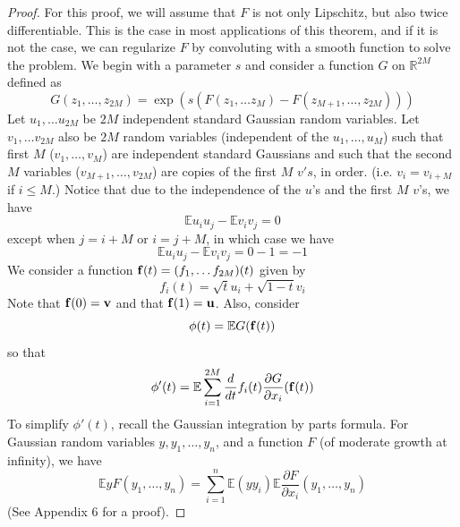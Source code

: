 \documentclass[12pt]{report}
\theoremstyle{definition}
\begin{document}
\begin{proof}
For this proof, we will assume that $F$ is not only Lipschitz, but also twice differentiable.  This is the case in most applications of this theorem, and if it is not the case, we can regularize $F$ by convoluting with a smooth function to solve the problem.  We begin with a parameter $s$ and consider a function $G$ on $\mathbb{R}^{2M}$ defined as 
$$
G(z_1,\dots,z_{2M})=\exp\left ( s(F(z_1,\dots z_M)-F(z_{M+1},\dots, z_{2M}))\right)
$$
Let $u_1,\dots u_{2M}$ be $2M$ independent standard Gaussian random variables.  Let $v_1,\dots v_{2M}$ also be $2M$ random variables (independent of the $u_1,\dots, u_M$) such that first $M$ ($v_1,\dots, v_M$) are independent standard Gaussians and such that the second $M$ variables ($v_{M+1}, \dots, v_{2M}$) are copies of the first $M$ $v's$, in order.  (i.e. $v_i=v_{i+M}$ if $i\leq M$.)
Notice that due to the independence of the $u$'s and the first $M$ $v$'s, we have 
$$
\mathbb{E}u_iu_j-\mathbb{E}v_iv_j =0
$$
except when $j=i+M $ or $i=j+M$, in which case we have 
$$
\mathbb{E}u_iu_j-\mathbb{E}v_iv_j=0-1=-1
$$
We consider a function ${\bf f}(t)=(f_1,\dots f_{2M})(t)$ given by 
$$
f_i(t)=\sqrt{t}u_i+\sqrt{1-t}v_i
$$
Note that ${\bf f}(0)={\bf v}$ and that ${\bf f}(1)={\bf u}$.  
Also, consider 
$$
\phi(t)=\mathbb{E}G({\bf f}(t))
$$
so that 
$$ \phi '(t)=\mathbb{E}\sum_{i=1}^{2M}\frac{d}{dt}f_i(t)\frac{\partial G}{\partial x_i}({\bf f}(t))
$$
To simplify $\phi '(t)$, recall the Gaussian integration by parts formula.  For Gaussian random variables $y,y_1,\dots, y_n$, and a function $F$ (of moderate growth at infinity), we have
$$
\mathbb{E}yF(y_1,\dots,y_n)=\sum_{i=1}^n \mathbb{E}(y y_i)\mathbb{E}\frac{\partial F}{\partial x_i}(y_1,\dots, y_n)
$$
(See \cite{Talagrandbook} Appendix 6 for a proof).



\end{proof}
\end{document}
